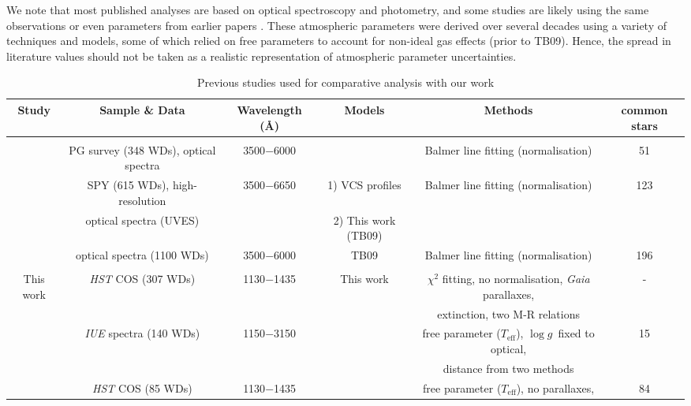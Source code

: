 \documentclass[fleqn,usenatbib, useAMS]{mnras}
\newcommand{\Teff}{\mbox{$T_{\mathrm{eff}}$}}
\newcommand{\logg}{\mbox{$\log g$}}
\begin{document}
We note that most published analyses are based on optical spectroscopy and photometry, and some studies are likely using the same observations or even parameters from earlier papers \citep[e.g.][]{Liebert2005, Gianninas2011, Limoges2015}. These atmospheric parameters were derived over several decades using a variety of techniques and models, some of which relied on free parameters to account for non-ideal gas effects (prior to TB09). Hence, the spread in literature values should not be taken as a realistic representation of atmospheric parameter uncertainties. 
\begin{table*}
\centering
\caption{Previous studies used for comparative analysis with our work}
\addtolength{\tabcolsep}{-7pt}
\begin{tabular}{cccccc}
\hline
\hline
Study	&	Sample \& Data	&	Wavelength (\AA)	&	Models	&	Methods	& common stars\\\hline
\noalign{\smallskip}
\multicolumn{6}{c}{Spectroscopy} \\
\noalign{\smallskip}
\hline
%
\cite{Liebert2005}	&	PG survey (348 WDs), optical spectra 	&	3500$-$6000	& \cite{Liebert2005} &	Balmer line fitting (normalisation)	&	51	\\
\cite{Koester2009}	&	SPY (615 WDs), high-resolution &	3500$-$6650	& 1) VCS profiles &	Balmer line fitting (normalisation)	&	123	\\
& optical spectra (UVES)& &2) This work (TB09) &&\\
\cite{Gianninas2011}	& optical spectra (1100 WDs) 	&	3500$-$6000	& TB09	& Balmer line fitting (normalisation)	&	196	\\\hline
%
\noalign{\smallskip}
\multicolumn{6}{c}{Spectrophotometry}\\
\noalign{\smallskip}
\hline
%
This work	&	\textit{HST} COS (307 WDs) &	1130$-$1435	& This work	&	$\chi^{2}$ fitting, no normalisation, \textit{Gaia} parallaxes, & -\\
&&&& extinction, two M-R relations &		\\
\cite{Lajoie2007}	& \textit{IUE} spectra (140 WDs) &	1150$-$3150	& \cite{Liebert2005}	& free parameter (\Teff), \logg\ fixed to optical, &	15	\\
&&&& distance from two methods &\\
\cite{Koester2014}	&	\textit{HST} COS (85 WDs)  &	1130$-$1435	& \cite{Koester2010}		&	free parameter (\Teff), no parallaxes, & 84\\

\end{tabular}
\end{table*}
\end{document}
